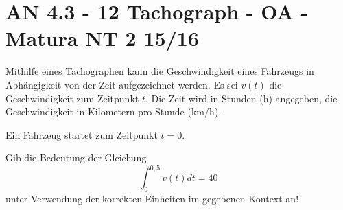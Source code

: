 \section{AN 4.3 - 12 Tachograph - OA - Matura NT 2 15/16}

\begin{beispiel}[AN 4.3]{1} %
Mithilfe eines Tachographen kann die Geschwindigkeit eines Fahrzeugs in Abhängigkeit von der Zeit aufgezeichnet werden. Es sei $v(t)$ die Geschwindigkeit zum Zeitpunkt $t$. Die Zeit wird in Stunden (h) angegeben, die Geschwindigkeit in Kilometern pro Stunde (km/h).

Ein Fahrzeug startet zum Zeitpunkt $t=0$.

Gib die Bedeutung der Gleichung $$\int^{0,5}_0{v(t)}dt=40$$ unter Verwendung der korrekten Einheiten im gegebenen Kontext an!\leer

\end{beispiel}